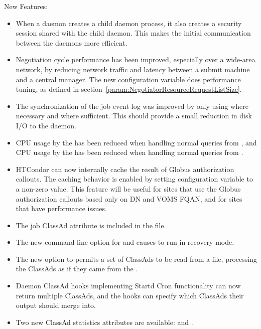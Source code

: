 \noindent New Features:

\begin{itemize}

\item When a daemon creates a child daemon process, it also creates a
security session shared with the child daemon.
This makes the initial communication between the daemons more efficient.

\item Negotiation cycle performance has been improved, especially
over a wide-area network, by reducing network traffic and latency
between a submit machine and a central manager.
The new configuration variable 
does performance tuning, as defined 
in section~\ref{param:NegotiatorResourceRequestListSize}.

\item The synchronization of the job event log was improved by only
using  where necessary and 
 where sufficient.  
This should provide a small reduction in disk I/O to 
the  daemon.

\item CPU usage by the  has been reduced when
handling normal queries from ,
and CPU usage by the  has been reduced when
handling normal queries from .

\item HTCondor can now internally cache the result of Globus authorization
callouts.  
The caching behavior is enabled by setting configuration variable
 to a non-zero value.
This feature will be useful for sites that use the Globus authorization
callouts based only on DN and VOMS FQAN, and for sites that have 
performance issues.

\item The job ClassAd attribute  is included in 
the  file.

\item The new  command line option for 
and  causes  to run in
recovery mode.

\item The new  option to  permits a set of ClassAds
to be read from a file, processing the ClassAds as if they came from
the .

\item Daemon ClassAd hooks implementing Startd Cron functionality  
can now return multiple ClassAds,
and the hooks can specify which ClassAds their output should merge into.

\item Two new  ClassAd statistics attributes are
available:  and .

\end{itemize}

